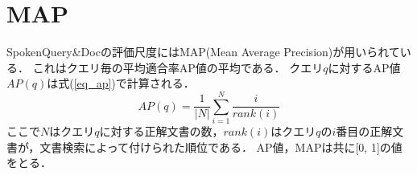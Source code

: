 \section{MAP}
SpokenQuery\&Docの評価尺度にはMAP(Mean Average Precision)が用いられている．
これはクエリ毎の平均適合率AP値の平均である．
クエリ$q$に対するAP値$AP(q)$は式(\ref{eq_ap})で計算される．
\begin{equation}
    AP(q) = \frac{1}{|N|} \sum^N_{i=1} \frac{i}{rank(i)}    \label{eq_ap}
\end{equation}
ここで$N$はクエリ$q$に対する正解文書の数，$rank(i)$はクエリ$q$の$i$番目の正解文書が，文書検索によって付けられた順位である．
AP値，MAPは共に[0, 1]の値をとる．
